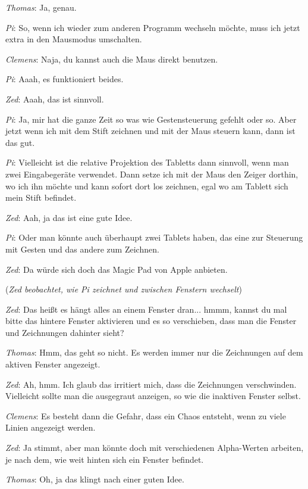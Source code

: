 \medskip \emph{Thomas}: Ja, genau.

\medskip \emph{Pi}: So, wenn ich wieder zum anderen Programm wechseln möchte, muss ich jetzt extra in den Mausmodus umschalten.

\medskip \emph{Clemens}: Naja, du kannst auch die Maus direkt benutzen.

\medskip \emph{Pi}: Aaah, es funktioniert beides.

\medskip \emph{Zed}: Aaah, das ist sinnvoll.

\medskip \emph{Pi}: Ja, mir hat die ganze Zeit so was wie Gestensteuerung gefehlt oder so. Aber jetzt wenn ich mit dem Stift zeichnen und mit der Maus steuern kann, dann ist das gut.

\medskip \emph{Pi}: Vielleicht ist die relative Projektion des Tabletts dann sinnvoll, wenn man zwei Eingabegeräte verwendet. Dann setze ich mit der Maus den Zeiger dorthin, wo ich ihn möchte und kann sofort dort los zeichnen, egal wo am Tablett sich mein Stift befindet.

\medskip \emph{Zed}: Aah, ja das ist eine gute Idee.

\medskip \emph{Pi}: Oder man könnte auch überhaupt zwei Tablets haben, das eine zur Steuerung mit Gesten und das andere zum Zeichnen.

\medskip \emph{Zed}: Da würde sich doch das Magic Pad von Apple anbieten.

\medskip (\emph{Zed beobachtet, wie Pi zeichnet und zwischen Fenstern wechselt})

\medskip \emph{Zed}: Das heißt es hängt alles an einem Fenster dran... hmmm, kannst du mal bitte das hintere Fenster aktivieren und es so verschieben, dass man die Fenster und Zeichnungen dahinter sieht?

\medskip \emph{Thomas}: Hmm, das geht so nicht. Es werden immer nur die Zeichnungen auf dem aktiven Fenster angezeigt.

\medskip \emph{Zed}: Ah, hmm. Ich glaub das irritiert mich, dass die Zeichnungen verschwinden. Vielleicht sollte man die ausgegraut anzeigen, so wie die inaktiven Fenster selbst.

\medskip \emph{Clemens}: Es besteht dann die Gefahr, dass ein Chaos entsteht, wenn zu viele Linien angezeigt werden.

\medskip \emph{Zed}: Ja stimmt, aber man könnte doch mit verschiedenen Alpha-Werten arbeiten, je nach dem, wie weit hinten sich ein Fenster befindet.

\medskip \emph{Thomas}: Oh, ja das klingt nach einer guten Idee.

